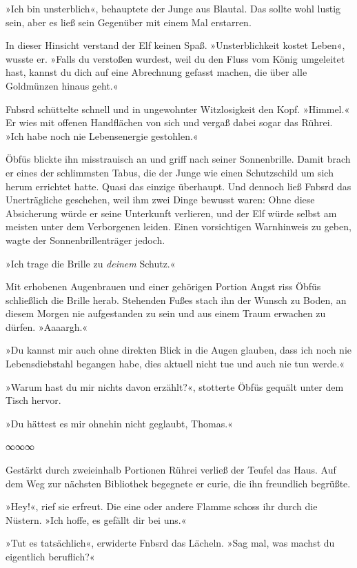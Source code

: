 »Ich bin unsterblich«, behauptete der Junge aus Blautal. Das sollte wohl lustig sein, aber es ließ sein Gegenüber mit einem Mal erstarren.

In dieser Hinsicht verstand der Elf keinen Spaß. »Unsterblichkeit kostet Leben«, wusste er. »Falls du verstoßen wurdest, weil du den Fluss vom König umgeleitet hast, kannst du dich auf eine Abrechnung gefasst machen, die über alle Goldmünzen hinaus geht.«

Fnbsrd schüttelte schnell und in ungewohnter Witzlosigkeit den Kopf. »Himmel.« Er wies mit offenen Handflächen von sich und vergaß dabei sogar das Rührei. »Ich habe noch nie Lebensenergie gestohlen.«

Öbfüs blickte ihn misstrauisch an und griff nach seiner Sonnenbrille. Damit brach er eines der schlimmsten Tabus, die der Junge wie einen Schutzschild um sich herum errichtet hatte. Quasi das einzige überhaupt. Und dennoch ließ Fnbsrd das Unerträgliche geschehen, weil ihm zwei Dinge bewusst waren: Ohne diese Absicherung würde er seine Unterkunft verlieren, und der Elf würde selbst am meisten unter dem Verborgenen leiden. Einen vorsichtigen Warnhinweis zu geben, wagte der Sonnenbrillenträger jedoch.

»Ich trage die Brille zu \emph{deinem} Schutz.«

Mit erhobenen Augenbrauen und einer gehörigen Portion Angst riss Öbfüs schließlich die Brille herab. Stehenden Fußes stach ihn der Wunsch zu Boden, an diesem Morgen nie aufgestanden zu sein und aus einem Traum erwachen zu dürfen. »Aaaargh.«

»Du kannst mir auch ohne direkten Blick in die Augen glauben, dass ich noch nie Lebensdiebstahl begangen habe, dies aktuell nicht tue und auch nie tun werde.«

»Warum hast du mir nichts davon erzählt?«, stotterte Öbfüs gequält unter dem Tisch hervor.

»Du hättest es mir ohnehin nicht geglaubt, Thomas.«

\begin{center}
∞∞∞
\end{center}

Gestärkt durch zweieinhalb Portionen Rührei verließ der Teufel das Haus. Auf dem Weg zur nächsten Bibliothek begegnete er curie, die ihn freundlich begrüßte.

»Hey!«, rief sie erfreut. Die eine oder andere Flamme schoss ihr durch die Nüstern. »Ich hoffe, es gefällt dir bei uns.«

»Tut es tatsächlich«, erwiderte Fnbsrd das Lächeln. »Sag mal, was machst du eigentlich beruflich?«

